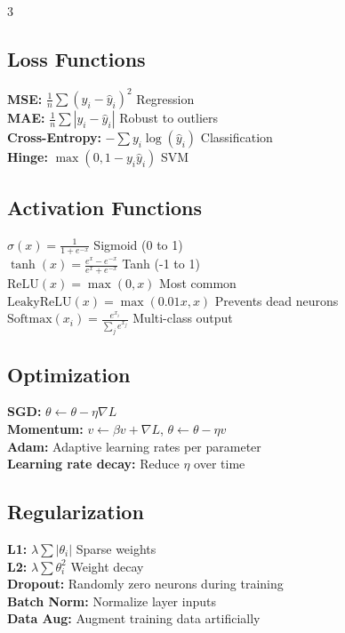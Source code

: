 \documentclass[7pt,landscape]{extarticle}
\begin{document}
\begin{multicols*}{3}
\subsection*{Loss Functions}
\textbf{MSE:} $\frac{1}{n}\sum(y_i - \hat{y}_i)^2$ \hfill Regression \\
\textbf{MAE:} $\frac{1}{n}\sum|y_i - \hat{y}_i|$ \hfill Robust to outliers \\
\textbf{Cross-Entropy:} $-\sum y_i \log(\hat{y}_i)$ \hfill Classification \\
\textbf{Hinge:} $\max(0, 1-y_i\hat{y}_i)$ \hfill SVM

\subsection*{Activation Functions}
$\sigma(x) = \frac{1}{1+e^{-x}}$ \hfill Sigmoid (0 to 1) \\
$\tanh(x) = \frac{e^x-e^{-x}}{e^x+e^{-x}}$ \hfill Tanh (-1 to 1) \\
$\text{ReLU}(x) = \max(0, x)$ \hfill Most common \\
$\text{LeakyReLU}(x) = \max(0.01x, x)$ \hfill Prevents dead neurons \\
$\text{Softmax}(x_i) = \frac{e^{x_i}}{\sum_j e^{x_j}}$ \hfill Multi-class output

\subsection*{Optimization}
\textbf{SGD:} $\theta \leftarrow \theta - \eta \nabla L$ \\
\textbf{Momentum:} $v \leftarrow \beta v + \nabla L$, $\theta \leftarrow \theta - \eta v$ \\
\textbf{Adam:} Adaptive learning rates per parameter \\
\textbf{Learning rate decay:} Reduce $\eta$ over time

\subsection*{Regularization}
\textbf{L1:} $\lambda \sum |\theta_i|$ \hfill Sparse weights \\
\textbf{L2:} $\lambda \sum \theta_i^2$ \hfill Weight decay \\
\textbf{Dropout:} Randomly zero neurons during training \\
\textbf{Batch Norm:} Normalize layer inputs \\
\textbf{Data Aug:} Augment training data artificially


\end{multicols*}
\end{document}
